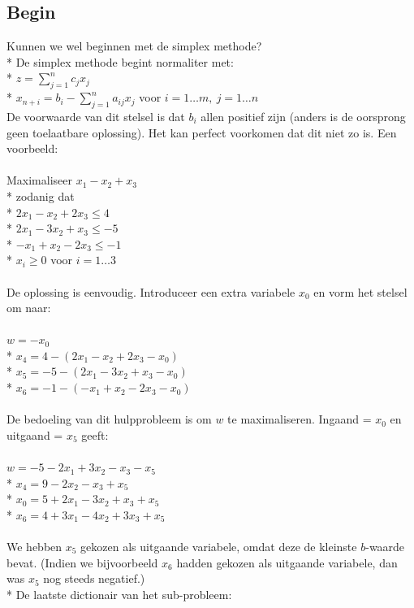 \documentclass[10pt]{article}
\begin{document}
\subsection{Begin}
Kunnen we wel beginnen met de simplex methode?\\*
De simplex methode begint normaliter met:\\*
$z = \sum_{j=1}^nc_jx_j$\\*
$x_{n+i} = b_i - \sum_{j=1}^na_{ij}x_j$ voor $i = 1 \dots m,\ j = 1 \dots n$\\
De voorwaarde van dit stelsel is dat $b_i$ allen positief zijn (anders is de oorsprong geen toelaatbare oplossing). Het kan perfect voorkomen dat dit niet zo is. Een voorbeeld:\\\\
Maximaliseer $x_1 - x_2 + x_3$\\*
zodanig dat\\*
$2x_1 - x_2 + 2x_3 \le 4$\\*
$2x_1 - 3x_2 + x_3 \le -5$\\*
$-x_1 + x_2 - 2x_3 \le -1$\\*
$x_i \ge 0$ voor $i = 1\dots3$\\\\
De oplossing is eenvoudig. Introduceer een extra variabele $x_0$ en vorm het stelsel om naar:\\\\
$w = -x_0$\\*
$x_4 = 4 - (2x_1 - x_2 + 2x_3 - x_0)$\\*
$x_5 = -5 - (2x_1 - 3x_2 + x_3 - x_0)$\\*
$x_6 = -1 - (-x_1 + x_2 - 2x_3 - x_0)$\\\\
De bedoeling van dit hulpprobleem is om $w$ te maximaliseren. Ingaand = $x_0$ en uitgaand = $x_5$ geeft:\\\\
$w = -5 - 2x_1 + 3x_2 - x_3 - x_5$\\*
$x_4 = 9 - 2x_2 - x_3 + x_5$\\*
$x_0 = 5 + 2x_1 - 3x_2 + x_3 + x_5$\\*
$x_6 = 4 + 3x_1 - 4x_2 + 3x_3 + x_5$\\\\
We hebben $x_5$ gekozen als uitgaande variabele, omdat deze de kleinste $b$-waarde bevat. (Indien we bijvoorbeeld $x_6$ hadden gekozen als uitgaande variabele, dan was $x_5$ nog steeds negatief.)\\*
De laatste dictionair van het sub-probleem:\\\\
\end{document}
